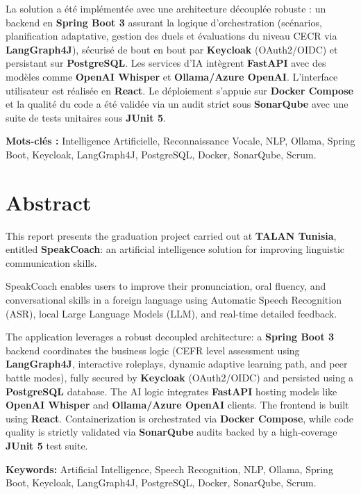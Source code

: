 \documentclass[12pt,a4paper]{report}
\begin{document}
La solution a été implémentée avec une architecture découplée robuste : un backend en \textbf{Spring Boot 3} assurant la logique d'orchestration (scénarios, planification adaptative, gestion des duels et évaluations du niveau CECR via \textbf{LangGraph4J}), sécurisé de bout en bout par \textbf{Keycloak} (OAuth2/OIDC) et persistant sur \textbf{PostgreSQL}. Les services d'IA intègrent \textbf{FastAPI} avec des modèles comme \textbf{OpenAI Whisper} et \textbf{Ollama/Azure OpenAI}. L'interface utilisateur est réalisée en \textbf{React}. Le déploiement s'appuie sur \textbf{Docker Compose} et la qualité du code a été validée via un audit strict sous \textbf{SonarQube} avec une suite de tests unitaires sous \textbf{JUnit 5}.

\textbf{Mots-clés :} Intelligence Artificielle, Reconnaissance Vocale, NLP, Ollama, Spring Boot, Keycloak, LangGraph4J, PostgreSQL, Docker, SonarQube, Scrum.

\vspace{1cm}

\chapter*{Abstract}

This report presents the graduation project carried out at \textbf{TALAN Tunisia}, entitled \textbf{SpeakCoach}: an artificial intelligence solution for improving linguistic communication skills.

SpeakCoach enables users to improve their pronunciation, oral fluency, and conversational skills in a foreign language using Automatic Speech Recognition (ASR), local Large Language Models (LLM), and real-time detailed feedback.

The application leverages a robust decoupled architecture: a \textbf{Spring Boot 3} backend coordinates the business logic (CEFR level assessment using \textbf{LangGraph4J}, interactive roleplays, dynamic adaptive learning path, and peer battle modes), fully secured by \textbf{Keycloak} (OAuth2/OIDC) and persisted using a \textbf{PostgreSQL} database. The AI logic integrates \textbf{FastAPI} hosting models like \textbf{OpenAI Whisper} and \textbf{Ollama/Azure OpenAI} clients. The frontend is built using \textbf{React}. Containerization is orchestrated via \textbf{Docker Compose}, while code quality is strictly validated via \textbf{SonarQube} audits backed by a high-coverage \textbf{JUnit 5} test suite.

\textbf{Keywords:} Artificial Intelligence, Speech Recognition, NLP, Ollama, Spring Boot, Keycloak, LangGraph4J, PostgreSQL, Docker, SonarQube, Scrum.
\end{document}
